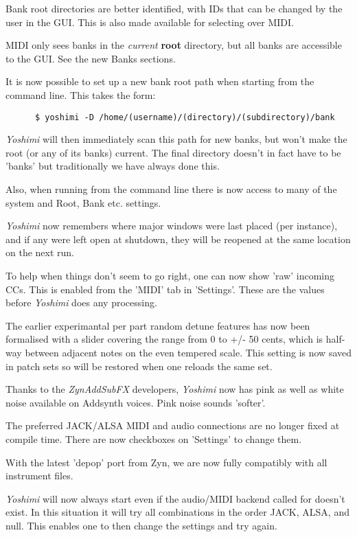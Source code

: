 \documentclass[
 11pt,
 twoside,
 a4paper,
 headinclude,
 footinclude,
 final                                 %
]{article}
\begin{document}
   Bank root directories are better identified, with IDs that can be changed by
   the user in the GUI. This is also made available for selecting over MIDI.

   MIDI only sees banks in the \textsl{current}
   \textbf{root} directory, but all banks are accessible to the GUI.
   See the new Banks sections.

   It is now possible to set up a new bank root path when starting from the
   command line. This takes the form:

   \begin{verbatim}
      $ yoshimi -D /home/(username)/(directory)/(subdirectory)/bank
   \end{verbatim}

   \textsl{Yoshimi} will then immediately scan this path for new banks, but
   won't make the root (or any of its banks) current. The final directory
   doesn't in fact have to be 'banks' but traditionally we have always done
   this.

   Also, when running from the command line there is now access to many of the
   system and Root, Bank etc. settings.

   \textsl{Yoshimi} now remembers where major windows were last placed (per
   instance), and if any were left open at shutdown, they will be reopened at
   the same location on the next run.

   To help when things don't seem to go right, one can now show 'raw' incoming
   CCs. This is enabled from the 'MIDI' tab in 'Settings'. These are the values
   before \textsl{Yoshimi} does any processing.

   The earlier experimantal per part random detune features has now been
   formalised with a slider covering the range from 0 to +/- 50 cents, which is
   half-way between adjacent notes on the even tempered scale. This setting is
   now saved in patch sets so will be restored when one reloads the same set.

   Thanks to the \textsl{ZynAddSubFX} developers, \textsl{Yoshimi}
   now has pink as well as white noise
   available on Addsynth voices. Pink noise sounds 'softer'.

   The preferred JACK/ALSA MIDI and audio connections are no longer fixed at
   compile time. There are now checkboxes on 'Settings' to change them.

   With the latest 'depop' port from Zyn, we are now fully compatibly with all
   instrument files.

   \textsl{Yoshimi} will now always start even if the audio/MIDI backend called
   for doesn't exist. In this situation it will try all combinations in the
   order JACK, ALSA, and null. This enables one to then change the settings and
   try again.
\end{document}
